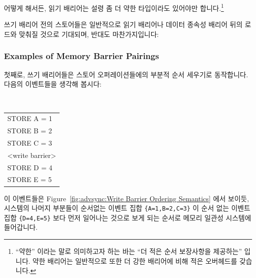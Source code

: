 \begin{enumerate}
어떻게 해서든, 읽기 배리어는 설령 좀 더 약한 타입이라도 있어야만
합니다.\footnote{
	``약한'' 이라는 말로 의미하고자 하는 바는 ``더 적은 순서 보장사항을
	제공하는'' 입니다.
	약한 배리어는 일반적으로 또한 더 강한 배리어에 비해 적은 오버헤드를
	갖습니다.}

쓰기 배리어 전의 스토어들은 일반적으로 읽기 배리어나 데이터 종속성 배리어 뒤의
로드와 맞춰질 것으로 기대되며, 반대도 마찬가지입니다:

\begin{center}
\end{center}

\subsubsection{Examples of Memory Barrier Pairings}
\label{sec:advsync:Examples of Memory Barrier Pairings}

첫째로, 쓰기 배리어들은 스토어 오퍼레이션들에의 부분적 순서 세우기로
동작합니다.
다음의 이벤트들을 생각해 봅시다:

\vspace{5pt}
\begin{minipage}[t]{\columnwidth}
\tt
\scriptsize
\begin{tabular}{l}
	STORE A = 1 \\
	STORE B = 2 \\
	STORE C = 3 \\
	<write barrier> \\
	STORE D = 4 \\
	STORE E = 5 \\
\end{tabular}
\end{minipage}
\vspace{5pt}

이 이벤트들은 Figure~\ref{fig:advsync:Write Barrier Ordering Semantics} 에서
보이듯, 시스템의 나머지 부분들이 순서없는 이벤트 집합 {\tt \{A=1,B=2,C=3\}} 이
순서 없는 이벤트 집합 {\tt \{D=4,E=5\}} 보다 먼저 일어나는 것으로 보게 되는
순서로 메모리 일관성 시스템에 들어갑니다.
\iffalse


\end{enumerate}
